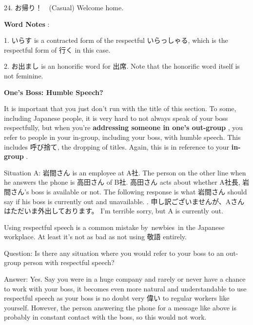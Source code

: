 \par{24. お帰り！　(Casual) \hfill\break
Welcome home. }

\par{\textbf{Word Notes }: }

\par{1. いらす is a contracted form of the respectful いらっしゃる, which is the respectful form of 行く in this case. }

\par{2. お出まし is an honorific word for 出席. Note that the honorific word itself is not feminine. }

\begin{center}
 \textbf{One's Boss: Humble Speech? }
\end{center}

\par{  It is important that you just don't run with the title of this section. To some, including Japanese people, it is very hard to not always speak of your boss respectfully, but when you're \textbf{addressing someone in one's out-group }, you refer to people in your in-group, including your boss, with humble speech. This includes 呼び捨て, the dropping of titles. Again, this is in reference to your \textbf{in-group }. }

\par{Situation A: 岩間さん is an employee at A社. The person on the other line when he answers the phone is 高田さん of B社. 高田さん acts about whether A社長, 岩間さん's boss is available or not. The following response is what 岩間さん should say if his boss is currently out and unavailable. \hfill\break
\hfill{}. 申し訳ございませんが、Aさんはただいま外出しております。 \hfill\break
I'm terrible sorry, but A is currently out. }

\par{ Using respectful speech is a common mistake by newbies in the Japanese workplace. At least it's not as bad as not using 敬語 entirely. }

\par{Question: Is there any situation where you would refer to your boss to an out-group person with respectful speech? }

\par{Answer: Yes. Say you were in a huge company and rarely or never have a chance to work with your boss, it becomes even more natural and understandable to use respectful speech as your boss is no doubt very 偉い to regular workers like yourself. However, the person answering the phone for a message like above is probably in constant contact with the boss, so this would not work. }
      

